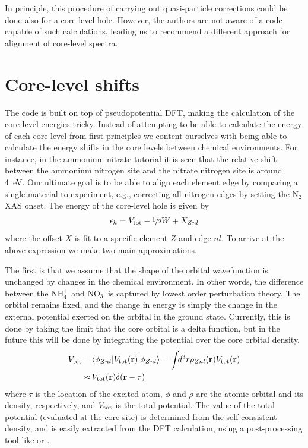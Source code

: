 \documentclass[11pt]{report}
\begin{document}
In principle, this procedure of carrying out quasi-particle corrections could be done also for a core-level hole. 
However, the authors are not aware of a code capable of such calculations, leading us to recommend a different approach for alignment of core-level spectra.

\section{Core-level shifts}

The  code is built on top of pseudopotential DFT, making the calculation of the core-level energies tricky. 
Instead of attempting to be able to calculate the energy of each core level from first-principles we content ourselves with being able to calculate the energy shifts in the core levels between chemical environments.
For instance, in the ammonium nitrate tutorial it is seen that the relative shift between the ammonium nitrogen site and the nitrate nitrogen site is around 4~eV. 
Our ultimate goal is to be able to align each element edge by comparing a single material to experiment, e.g., correcting all nitrogen edges by setting the N$_2$ XAS onset. 
The energy of the core-level hole is given by
\begin{align}
\epsilon_h = V_{\rm{tot}} - \sfrac{1}{2} W + X_{Znl}
\end{align}
where the offset $X$ is fit to a specific element $Z$ and edge $nl$. 
To arrive at the above expression we make two main approximations.

The first is that we assume that the shape of the orbital wavefunction is unchanged by changes in the chemical environment. In other words, the difference between the NH$_4^+$ and NO$_3^-$ is captured by lowest order perturbation theory. 
The orbital remains fixed, and the change in energy is simply the change in the external potential exerted on the orbital in the ground state. 
Currently, this is done by taking the limit that the core orbital is a delta function, but in the future this will be done by integrating the potential over the core orbital density. 
\begin{align}
V_{\rm{tot}} =& \, \langle \phi_{Znl} \vert V_{\rm{tot}}(\mathbf{r}) \vert \phi_{Znl} \rangle = \int \!\! d^3r \rho_{Znl}(\mathbf{r})  V_{\rm{tot}}(\mathbf{r}) \nonumber \\
\approx&  \, V_{\rm{tot}}(\mathbf{r})  \delta(\mathbf{r} - \mathbf{\tau}) 
\label{CLS_Vext}
\end{align}
where $\tau$ is the location of the excited atom, $\phi$ and $\rho$ are the atomic orbital and its density, respectively, and $V_{\rm{tot}}$ is the total potential. 
The value of the total potential (evaluated at the core site) is determined from the self-consistent density, and is easily extracted from the DFT calculation, using a post-processing tool like  or .
\end{document}
